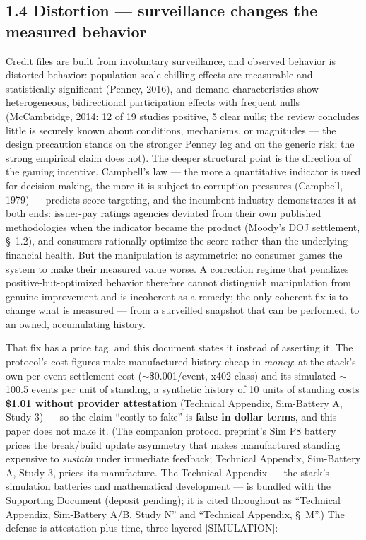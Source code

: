 \documentclass[
]{article}
\begin{document}
\subsection{1.4 Distortion --- surveillance changes the measured
behavior}\label{distortion-surveillance-changes-the-measured-behavior}

Credit files are built from involuntary surveillance, and observed
behavior is distorted behavior: population-scale chilling effects are
measurable and statistically significant (Penney, 2016), and demand
characteristics show heterogeneous, bidirectional participation effects
with frequent nulls (McCambridge, 2014: 12 of 19 studies positive, 5
clear nulls; the review concludes little is securely known about
conditions, mechanisms, or magnitudes --- the design precaution stands
on the stronger Penney leg and on the generic risk; the strong empirical
claim does not). The deeper structural point is the direction of the
gaming incentive. Campbell's law --- the more a quantitative indicator
is used for decision-making, the more it is subject to corruption
pressures (Campbell, 1979) --- predicts score-targeting, and the
incumbent industry demonstrates it at both ends: issuer-pay ratings
agencies deviated from their own published methodologies when the
indicator became the product (Moody's DOJ settlement, §~1.2), and
consumers rationally optimize the score rather than the underlying
financial health. But the manipulation is asymmetric: no consumer games
the system to make their measured value worse. A correction regime that
penalizes positive-but-optimized behavior therefore cannot distinguish
manipulation from genuine improvement and is incoherent as a remedy; the
only coherent fix is to change what is measured --- from a surveilled
snapshot that can be performed, to an owned, accumulating history.

That fix has a price tag, and this document states it instead of
asserting it. The protocol's cost figures make manufactured history
cheap in \emph{money}: at the stack's own per-event settlement cost
(\(\sim\)\$0.001/event, x402-class) and its simulated \(\sim\)100.5
events per unit of standing, a synthetic history of 10 units of standing
costs \textbf{\$1.01 without provider attestation} (Technical Appendix,
Sim-Battery A, Study 3) --- so the claim ``costly to fake'' is
\textbf{false in dollar terms}, and this paper does not make it. (The
companion protocol preprint's Sim P8 battery prices the break/build
update asymmetry that makes manufactured standing expensive to
\emph{sustain} under immediate feedback; Technical Appendix, Sim-Battery
A, Study 3, prices its manufacture. The Technical Appendix --- the
stack's simulation batteries and mathematical development --- is bundled
with the Supporting Document (deposit pending); it is cited throughout
as ``Technical Appendix, Sim-Battery A/B, Study N'' and ``Technical
Appendix, §~M''.) The defense is attestation plus time, three-layered
{[}SIMULATION{]}:
\end{document}
